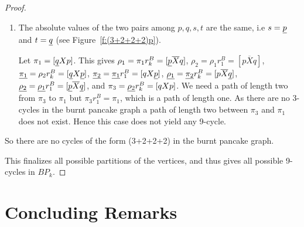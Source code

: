 \documentclass[final]{dmtcs-episciences}
\numberwithin{equation}{section}
\begin{document}
\begin{proof}
\begin{enumerate}
\begin{enumerate}
\begin{enumerate}
        As $\rho_{2}$ will have $\uline{s}$ at first position $\pi_{1}=[\uline{q}X \uline{s}Y p]$. This gives $\rho_{1}=\pi_{1}r^B_k=[\uline{p}\overline{Y}s\overline{X}q]$, $\rho_{2}=\rho_{1}r^B_{|Y|+2}=[\uline{s}Y p\overline{X}q]$, $\sigma_{1}=\rho_{2}r^B_k=[\uline{q}X \uline{p} \overline{Y}s]$, $\sigma_{2}=\sigma_{1}r^B_1=[qX \uline{p} \overline{Y}s]$, $\uline{\rho_{1}}=\sigma_{2}r^B_k=[\uline{s}Y p\overline{X}\uline{q}]$, $\uline{\rho_{2}}=\uline{\rho_{1}}r^B_{|Y|+2}=[\uline{p}\overline{Y}s\overline{X}\uline{q}]$, $\pi_{3}=\uline{\rho_{2}}r^B_k=[qX \uline{s}Y p]$. We need a path of length two from $\pi_{3}$ to $\pi_{1}$ but $\pi_{3}r^B_{1}=\pi_{1}$ which is a path of length one. As there are no 3-cycles in burnt pancake graph a path of length two between $\pi_{3}$ and $\pi_{1}$ does not exist. Hence this case does not give any 9-cycle.
    \end{enumerate}
    \item The absolute values of the two pairs among $p,q,s,t$ are the same, i.e $s=\uline{p}$ and $t=\uline{q}$ (see Figure~\ref{f:(3+2+2+2)p}).
    
        
        Let $\pi_{1}=[\uline{q} X p]$. This gives $\rho_{1}=\pi_{1}r^B_k=[\uline{p} \overline{X} q]$, $\rho_{2}=\rho_{1}r^B_1=[p \overline{X} q]$, $\uline{\pi_{1}}=\rho_{2}r^B_k=[\uline{q} X \uline{p}]$, $\uline{\pi_{2}}=\uline{\pi_{1}}r^B_1=[q X \uline{p}]$, $\uline{\rho_{1}}=\uline{\pi_{2}}r^B_k=[p \overline{X} \uline{q}]$, $\uline{\rho_{2}}=\uline{\rho_{1}}r^B_1=[\uline{p} \overline{X} \uline{q}]$, and $\pi_{3}=\uline{\rho_{2}}r^B_k=[q X p]$. We need a path of length two from $\pi_{3}$ to $\pi_{1}$ but $\pi_{3}r^B_{1}=\pi_{1}$, which is a path of length one. As there are no 3-cycles in the burnt pancake graph a path of length two between $\pi_{3}$ and $\pi_{1}$ does not exist. Hence this case does not yield any 9-cycle.
\end{enumerate}

So there are no cycles of the form (3+2+2+2) in the burnt pancake graph.
\end{enumerate}

This finalizes all possible partitions of the vertices, and thus gives all possible 9-cycles in $BP_{k}$.
\end{proof}


\section{Concluding Remarks}\label{s:conclusion}
\end{document}
